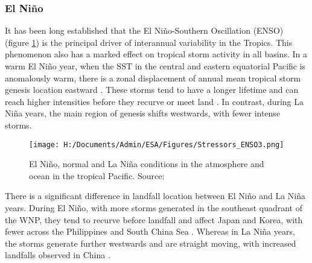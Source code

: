 

\subsubsection{El Ni\~{n}o}

It has been long established that the El Ni\~{n}o-Southern Oscillation (ENSO) (figure \ref{fig:nino}) is the principal driver of interannual variability in the Tropics. This phenomenon also has a marked effect on tropical storm activity in all basins. In a warm El Ni\~{n}o year, when the SST in the central and eastern equatorial Pacific is anomalously warm, there is a zonal displacement of annual mean tropical storm genesis location eastward \citep{lander1994exploratory, zhan2011contributions}. These storms tend to have a longer lifetime and can reach higher intensities before they recurve or meet land \citep{camargo2007cluster, chan1998seasonal}. In contrast, during La Ni\~{n}a years, the main region of genesis shifts westwards, with fewer intense storms.


\begin{figure}[h]
	\centering
	\noindent\texttt{[image: H:/Documents/Admin/ESA/Figures/Stressors\_ENSO3.png]}
	\caption{El Ni\~{n}o, normal and La Ni\~{n}a conditions in the atmosphere and ocean in the tropical Pacific. Source: \cite{noaa_enso}}\label{fig:nino}
\end{figure}


There is a significant difference in landfall location between El Ni\~{n}o and La Ni\~{n}a years. During El Ni\~{n}o, with more storms generated in the southeast quadrant of the WNP, they tend to recurve before landfall and affect Japan and Korea, with fewer across the Philippines and South China Sea \citep{liu2008interdecadal}. Whereas in La Ni\~{n}a years, the storms generate further westwards and are straight moving, with increased landfalls observed in China \citep{camargo2007cluster}.



